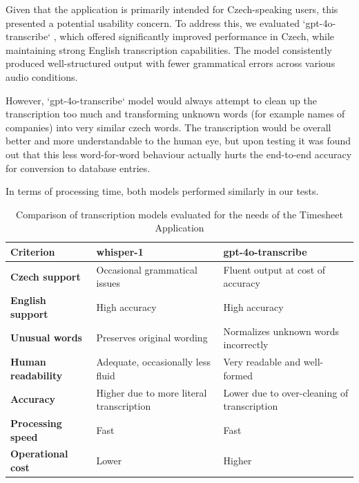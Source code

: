 \documentclass[
  digital,     %
  oneside,     %
  nosansbold,  %
  nocolorbold, %
  lof,         %
  lot,         %
]{fithesis4}
\begin{document}
\begin{markdown}
Given that the application is primarily intended for Czech-speaking users, this presented a potential usability concern. To address this, we evaluated `gpt-4o-transcribe` , which offered significantly improved performance in Czech, while maintaining strong English transcription capabilities. The model consistently produced well-structured output with fewer grammatical errors across various audio conditions.

However, `gpt-4o-transcribe` model would always attempt to clean up the transcription too much and transforming unknown words (for example names of companies) into very similar czech words. The transcription would be overall better and more understandable to the human eye, but upon testing it was found out that this less word-for-word behaviour actually hurts the end-to-end accuracy for conversion to database entries.

In terms of processing time, both models performed similarly in our tests. 

\end{markdown}
\shorthandon{-}

\begin{table}[h]
\centering
\begin{tabularx}{\textwidth}{|X|X|X|}
\hline
\textbf{Criterion} & \textbf{whisper-1} & \textbf{gpt-4o-transcribe} \\
\hline
\textbf{Czech support} & Occasional grammatical issues & Fluent output at cost of accuracy \\
\hline
\textbf{English support} & High accuracy & High accuracy \\
\hline
\textbf{Unusual words} & Preserves original wording & Normalizes unknown words incorrectly \\
\hline
\textbf{Human readability} & Adequate, occasionally less fluid & Very readable and well-formed \\
\hline
\textbf{Accuracy} & Higher due to more literal transcription & Lower due to over-cleaning of transcription \\
\hline
\textbf{Processing speed} & Fast & Fast \\
\hline
\textbf{Operational cost} & Lower & Higher \\
\hline
\end{tabularx}
\caption{Comparison of transcription models evaluated for the needs of the Timesheet Application}
\label{tab:transcription_models}
\end{table}
\end{document}
